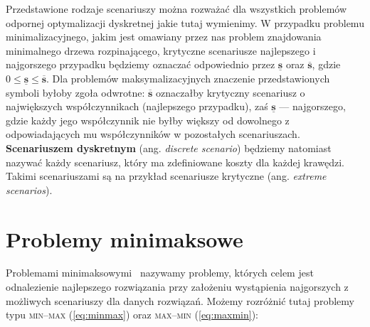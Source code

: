 Przedstawione rodzaje scenariuszy można rozważać dla wszystkich problemów odpornej optymalizacji dyskretnej jakie tutaj wymienimy. W przypadku problemu minimalizacyjnego, jakim jest omawiany przez nas problem znajdowania minimalnego drzewa rozpinającego, krytyczne scenariusze najlepszego i najgorszego przypadku będziemy oznaczać odpowiednio przez $\underline{\textbf{s}}$ oraz $\overline{\textbf{s}}$, gdzie $0 \leqslant \underline{\textbf{s}} \leqslant \overline{\textbf{s}}$. Dla problemów maksymalizacyjnych znaczenie przedstawionych symboli byłoby zgoła odwrotne: $\overline{\textbf{s}}$ oznaczałby krytyczny scenariusz o największych współczynnikach (najlepszego przypadku), zaś $\underline{\textbf{s}}$ --- najgorszego, gdzie każdy jego współczynnik nie byłby większy od dowolnego z odpowiadających mu współczynników w pozostałych scenariuszach. \textbf{Scenariuszem dyskretnym} (ang. \textit{discrete scenario}) będziemy natomiast nazywać każdy scenariusz, który ma zdefiniowane koszty dla każdej krawędzi. Takimi scenariuszami są na przykład scenariusze krytyczne (ang. \textit{extreme scenarios}).

\section{Problemy minimaksowe}

Problemami minimaksowymi~\cite[$428$]{minmaxSurvey} nazywamy problemy, których celem jest odnalezienie najlepszego rozwiązania przy założeniu wystąpienia najgorszych z możliwych scenariuszy dla danych rozwiązań. Możemy rozróżnić tutaj problemy typu \textsc{min--max} (\ref{eq:minmax}) oraz \textsc{max--min} (\ref{eq:maxmin}):

